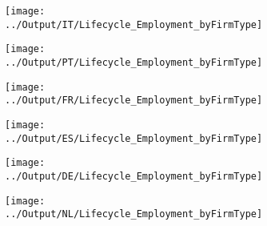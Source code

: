 \documentclass[12pt,notitlepage]{article}
\begin{document}
\begin{figure}[!htpb]
\centering
\caption{Average Employment by Year (Public vs. Private)}
\begin{subfigure}{.49\textwidth}
    \centering
 \texttt{[image: ../Output/IT/Lifecycle\_Employment\_byFirmType]}
\end{subfigure}%
\begin{subfigure}{.49\textwidth}
    \centering
 \texttt{[image: ../Output/PT/Lifecycle\_Employment\_byFirmType]}
\end{subfigure}
\begin{subfigure}{.49\textwidth}
    \centering
 \texttt{[image: ../Output/FR/Lifecycle\_Employment\_byFirmType]}
\end{subfigure}%
\begin{subfigure}{.49\textwidth}
    \centering
 \texttt{[image: ../Output/ES/Lifecycle\_Employment\_byFirmType]}
\end{subfigure}
\begin{subfigure}{.49\textwidth}
    \centering
 \texttt{[image: ../Output/DE/Lifecycle\_Employment\_byFirmType]}
\end{subfigure}
\begin{subfigure}{.49\textwidth}
    \centering
 \texttt{[image: ../Output/NL/Lifecycle\_Employment\_byFirmType]}
\end{subfigure}
\end{figure}
\pagebreak
\end{document}
